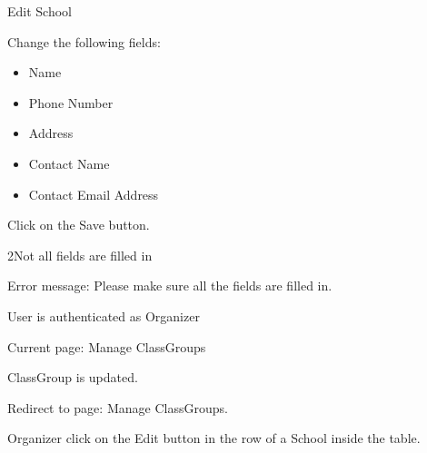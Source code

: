 
\begin{uc}{Edit School}


    \begin{uc-mss}
    \item Change the following fields:
        \begin{itemize}
            \item Name
            \item Phone Number
            \item Address
            \item Contact Name
            \item Contact Email Address
        \end{itemize}
    \item Click on the Save button.
    \end{uc-mss}

    \begin{uc-ext}

        \begin{uc-fail}{2}{Not all fields are filled in}
        \item Error message: Please make sure all the fields are filled in.
        \end{uc-fail}

    \end{uc-ext}

    \begin{uc-pre}
    \item User is authenticated as Organizer
    \item Current page: Manage ClassGroups
    \end{uc-pre}

    \begin{uc-post}
    \item ClassGroup is updated.
    \item Redirect to page: Manage ClassGroups.
    \end{uc-post}

    \begin{uc-trig}
        Organizer click on the Edit button in the row of a School inside the table.
    \end{uc-trig}

\end{uc}
